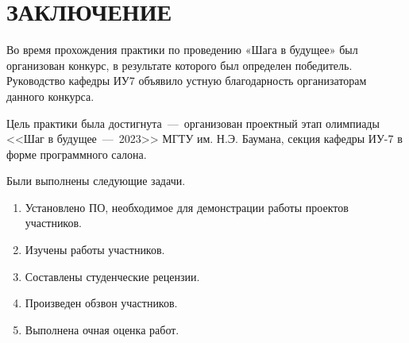 \chapter*{ЗАКЛЮЧЕНИЕ}

Во время прохождения практики по проведению «Шага в будущее» был организован конкурс, в результате которого был определен победитель. Руководство кафедры ИУ7 объявило устную благодарность организаторам данного конкурса.

Цель практики была достигнута~---~организован проектный этап олимпиады <<Шаг в будущее~---~2023>> МГТУ им. Н.Э. Баумана, секция кафедры ИУ-7 в форме программного салона.

Были выполнены следующие задачи.

\begin{enumerate}
	\item Установлено ПО, необходимое для демонстрации работы проектов участников.
	\item Изучены работы участников.
	\item Составлены студенческие рецензии.
	\item Произведен обзвон участников.
	\item Выполнена очная оценка работ.
\end{enumerate}

